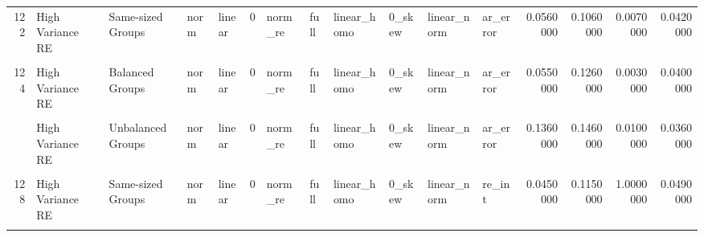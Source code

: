 \documentclass[12pt]{article}
\begin{document}
\begin{table}
{\begin{tabular}[t]{rllllrllllllrrrr}
122 & High Variance RE & Same-sized Groups & norm & linear & 0 & norm\_re & full & linear\_homo & 0\_skew & linear\_norm & ar\_error & 0.0560000 & 0.1060000 & 0.0070000 & 0.0420000\\
\cellcolor{gray!6}{123} & \cellcolor{gray!6}{High Variance Error} & \cellcolor{gray!6}{Balanced Groups} & \cellcolor{gray!6}{norm} & \cellcolor{gray!6}{linear} & \cellcolor{gray!6}{0} & \cellcolor{gray!6}{norm\_re} & \cellcolor{gray!6}{full} & \cellcolor{gray!6}{linear\_homo} & \cellcolor{gray!6}{0\_skew} & \cellcolor{gray!6}{linear\_norm} & \cellcolor{gray!6}{ar\_error} & \cellcolor{gray!6}{0.0500000} & \cellcolor{gray!6}{0.0940000} & \cellcolor{gray!6}{0.3130000} & \cellcolor{gray!6}{0.0420000}\\
124 & High Variance RE & Balanced Groups & norm & linear & 0 & norm\_re & full & linear\_homo & 0\_skew & linear\_norm & ar\_error & 0.0550000 & 0.1260000 & 0.0030000 & 0.0400000\\
\cellcolor{gray!6}{125} & \cellcolor{gray!6}{High Variance Error} & \cellcolor{gray!6}{Unbalanced Groups} & \cellcolor{gray!6}{norm} & \cellcolor{gray!6}{linear} & \cellcolor{gray!6}{0} & \cellcolor{gray!6}{norm\_re} & \cellcolor{gray!6}{full} & \cellcolor{gray!6}{linear\_homo} & \cellcolor{gray!6}{0\_skew} & \cellcolor{gray!6}{linear\_norm} & \cellcolor{gray!6}{ar\_error} & \cellcolor{gray!6}{0.0360000} & \cellcolor{gray!6}{0.1270000} & \cellcolor{gray!6}{0.4480000} & \cellcolor{gray!6}{0.0460000}\\
\addlinespace
126 & High Variance RE & Unbalanced Groups & norm & linear & 0 & norm\_re & full & linear\_homo & 0\_skew & linear\_norm & ar\_error & 0.1360000 & 0.1460000 & 0.0100000 & 0.0360000\\
\cellcolor{gray!6}{127} & \cellcolor{gray!6}{High Variance Error} & \cellcolor{gray!6}{Same-sized Groups} & \cellcolor{gray!6}{norm} & \cellcolor{gray!6}{linear} & \cellcolor{gray!6}{0} & \cellcolor{gray!6}{norm\_re} & \cellcolor{gray!6}{full} & \cellcolor{gray!6}{linear\_homo} & \cellcolor{gray!6}{0\_skew} & \cellcolor{gray!6}{linear\_norm} & \cellcolor{gray!6}{re\_int} & \cellcolor{gray!6}{0.0440000} & \cellcolor{gray!6}{0.0920000} & \cellcolor{gray!6}{0.9980000} & \cellcolor{gray!6}{0.0420000}\\
128 & High Variance RE & Same-sized Groups & norm & linear & 0 & norm\_re & full & linear\_homo & 0\_skew & linear\_norm & re\_int & 0.0450000 & 0.1150000 & 1.0000000 & 0.0490000\\
\cellcolor{gray!6}{129} & \cellcolor{gray!6}{High Variance Error} & \cellcolor{gray!6}{Balanced Groups} & \cellcolor{gray!6}{norm} & \cellcolor{gray!6}{linear} & \cellcolor{gray!6}{0} & \cellcolor{gray!6}{norm\_re} & \cellcolor{gray!6}{full} & \cellcolor{gray!6}{linear\_homo} & \cellcolor{gray!6}{0\_skew} & \cellcolor{gray!6}{linear\_norm} & \cellcolor{gray!6}{re\_int} & \cellcolor{gray!6}{0.0500000} & \cellcolor{gray!6}{0.1090000} & \cellcolor{gray!6}{0.9990000} & \cellcolor{gray!6}{0.0470000}\\

\end{tabular}}
\end{table}
\end{document}
